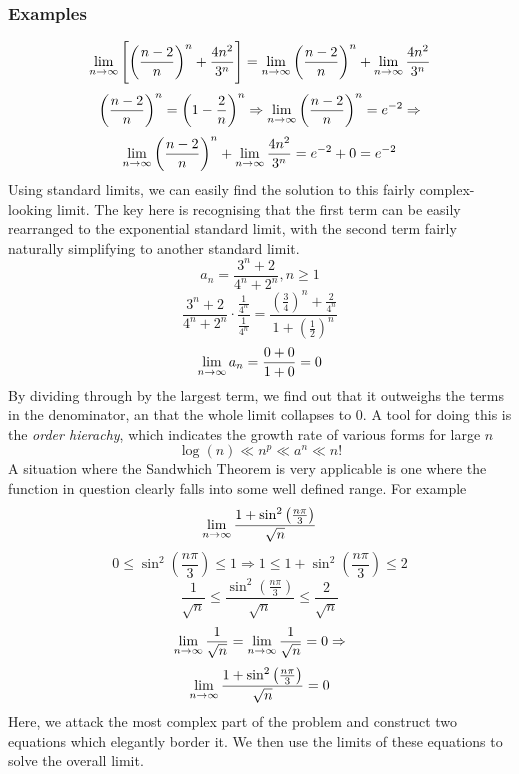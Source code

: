 \documentclass[12pt]{report}
\begin{document}
\begin{flushleft}
\subsubsection*{Examples}
\[\lim\limits_{n\rightarrow\infty}\left[\left(\frac{n - 2}{n}\right)^n 
+ \frac{4n^2}{3^n}\right] = 
\lim\limits_{n\rightarrow\infty} \left(\frac{n - 2}{n}\right)^n + 
\lim\limits_{n\rightarrow\infty} \frac{4n^2}{3^n}\]
\[\left(\frac{n - 2}{n}\right)^n = \left(1 - \frac{2}{n}\right)^n \Rightarrow
\lim\limits_{n\rightarrow\infty} \left(\frac{n - 2}{n}\right)^n = e^{-2} 
\Rightarrow\]
\[\lim\limits_{n\rightarrow\infty} \left(\frac{n - 2}{n}\right)^n + 
\lim\limits_{n\rightarrow\infty} \frac{4n^2}{3^n} = e^{-2} + 0 = e^{-2}\]
Using standard limits, we can easily find the solution to this fairly 
complex-looking limit. The key here is recognising that the first term can
be easily rearranged to the exponential standard limit, with the second term
fairly naturally simplifying to another standard limit.
\[a_n = \frac{3^n + 2}{4^n + 2^n}, n \geq 1\]
\[\frac{3^n + 2}{4^n + 2^n}\cdot\frac{\frac{1}{4^n}}{\frac{1}{4^n}} = 
\frac{\left(\frac{3}{4}\right)^n + \frac{2}{4^n}}{1 +
\left(\frac{1}{2}\right)^n}\]
\[\lim\limits_{n\rightarrow\infty} a_n = \frac{0 + 0}{1 + 0} = 0\]
By dividing through by the largest term, we find out that it outweighs the 
terms in the denominator, an that the whole limit collapses to \(0\). A tool
for doing this is the \textit{order hierachy}, which indicates the growth rate
of various forms for large \(n\)
\[\log(n) \ll n^p \ll a^n \ll n!\]
A situation where the Sandwhich Theorem is very applicable is one where the 
function in question clearly falls into some well defined range. For example
\[\lim\limits_{n\rightarrow\infty}\frac{1 + \sin^2\left(\frac{n\pi}{3}\right)}{
\sqrt{n}}\]
\[0 \leq \sin^2\left(\frac{n\pi}{3}\right) \leq 1 \Rightarrow 1 \leq 1 + 
\sin^2\left(\frac{n\pi}{3}\right) \leq 2\]
\[\frac{1}{\sqrt{n}} \leq \frac{\sin^2\left(\frac{n\pi}{3}\right)}{\sqrt{n}} 
\leq \frac{2}{\sqrt{n}}\]
\[\lim\limits_{n\rightarrow\infty}\frac{1}{\sqrt{n}} 
= \lim\limits_{n\rightarrow\infty}\frac{1}{\sqrt{n}} = 0 \Rightarrow\]
\[\lim\limits_{n\rightarrow\infty}\frac{1 + \sin^2\left(\frac{n\pi}{3}\right)}{
\sqrt{n}} = 0\]
Here, we attack the most complex part of the problem and construct two 
equations which elegantly border it. We then use the limits of these equations
to solve the overall limit.


\end{flushleft}
\end{document}
